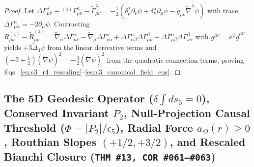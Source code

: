 \documentclass[11pt,a4paper]{article}
\theoremstyle{definition}
\theoremstyle{plain}
\theoremstyle{remark}
\begin{document}
\begin{proof}
Let $\Delta\Gamma^\lambda_{\mu\nu} \equiv {}^{(4)}\Gamma^\lambda_{\mu\nu} - \tilde{\Gamma}^\lambda_{\mu\nu} = -\frac{1}{2}(\delta^\lambda_\mu\partial_\nu\psi + \delta^\lambda_\nu\partial_\mu\psi - \tilde{g}_{\mu\nu}\tilde{\nabla}^\lambda\psi)$ with trace $\Delta\Gamma^\alpha_{\mu\alpha} = -2\partial_\mu\psi$. Contracting $R_{\mu\nu}^{(4)} - \tilde{R}_{\mu\nu}^{(4)} = \tilde{\nabla}_\alpha\Delta\Gamma^\alpha_{\mu\nu} - \tilde{\nabla}_\mu\Delta\Gamma^\alpha_{\nu\alpha} + \Delta\Gamma^\alpha_{\alpha\beta}\Delta\Gamma^\beta_{\mu\nu} - \Delta\Gamma^\alpha_{\mu\beta}\Delta\Gamma^\beta_{\nu\alpha}$ with $g^{\mu\nu} = e^\psi\tilde{g}^{\mu\nu}$ yields $+3\tilde{\Delta}_4\psi$ from the linear derivative terms and $(-2 + \frac{1}{2})(\tilde{\nabla}\psi)^2 = -\frac{3}{2}(\tilde{\nabla}\psi)^2$ from the quadratic connection terms, proving Eqs.~\eqref{eq:c3_r4_rescaling}--\eqref{eq:c3_canonical_field_eqs}.
\end{proof}

\subsection{\texorpdfstring{The 5D Geodesic Operator ($\delta\int ds_5 = 0$), Conserved Invariant $P_2$, Null-Projection Causal Threshold ($\Phi = |P_2|/\epsilon_5$), Radial Force $a_\Omega(r) \ge 0$, Routhian Slopes $(+1/2, +3/2)$, and Rescaled Bianchi Closure (\texttt{THM~\#13, COR~\#061--\#063})}{The 5D Geodesic Operator, Conserved Invariant P\_2, Null-Projection Causal Threshold, Radial Force, Routhian Slopes, and Rescaled Bianchi Closure}}
\end{document}
